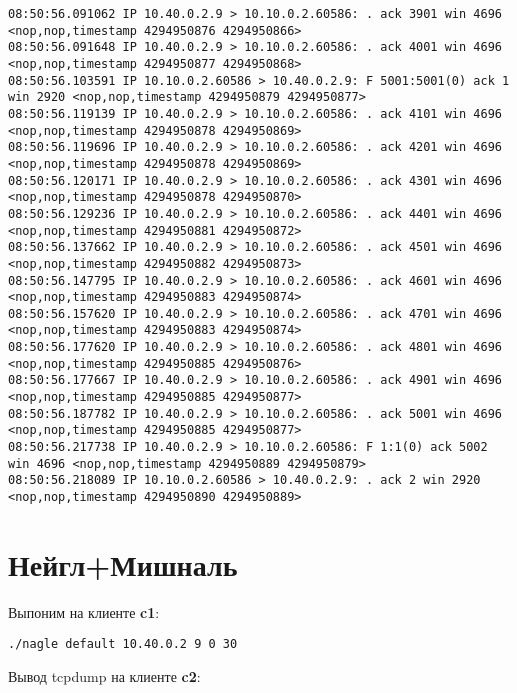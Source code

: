 \documentclass[a4paper,12pt]{article}
\begin{document}
\begin{Verbatim}
08:50:56.091062 IP 10.40.0.2.9 > 10.10.0.2.60586: . ack 3901 win 4696 <nop,nop,timestamp 4294950876 4294950866>
08:50:56.091648 IP 10.40.0.2.9 > 10.10.0.2.60586: . ack 4001 win 4696 <nop,nop,timestamp 4294950877 4294950868>
08:50:56.103591 IP 10.10.0.2.60586 > 10.40.0.2.9: F 5001:5001(0) ack 1 win 2920 <nop,nop,timestamp 4294950879 4294950877>
08:50:56.119139 IP 10.40.0.2.9 > 10.10.0.2.60586: . ack 4101 win 4696 <nop,nop,timestamp 4294950878 4294950869>
08:50:56.119696 IP 10.40.0.2.9 > 10.10.0.2.60586: . ack 4201 win 4696 <nop,nop,timestamp 4294950878 4294950869>
08:50:56.120171 IP 10.40.0.2.9 > 10.10.0.2.60586: . ack 4301 win 4696 <nop,nop,timestamp 4294950878 4294950870>
08:50:56.129236 IP 10.40.0.2.9 > 10.10.0.2.60586: . ack 4401 win 4696 <nop,nop,timestamp 4294950881 4294950872>
08:50:56.137662 IP 10.40.0.2.9 > 10.10.0.2.60586: . ack 4501 win 4696 <nop,nop,timestamp 4294950882 4294950873>
08:50:56.147795 IP 10.40.0.2.9 > 10.10.0.2.60586: . ack 4601 win 4696 <nop,nop,timestamp 4294950883 4294950874>
08:50:56.157620 IP 10.40.0.2.9 > 10.10.0.2.60586: . ack 4701 win 4696 <nop,nop,timestamp 4294950883 4294950874>
08:50:56.177620 IP 10.40.0.2.9 > 10.10.0.2.60586: . ack 4801 win 4696 <nop,nop,timestamp 4294950885 4294950876>
08:50:56.177667 IP 10.40.0.2.9 > 10.10.0.2.60586: . ack 4901 win 4696 <nop,nop,timestamp 4294950885 4294950877>
08:50:56.187782 IP 10.40.0.2.9 > 10.10.0.2.60586: . ack 5001 win 4696 <nop,nop,timestamp 4294950885 4294950877>
08:50:56.217738 IP 10.40.0.2.9 > 10.10.0.2.60586: F 1:1(0) ack 5002 win 4696 <nop,nop,timestamp 4294950889 4294950879>
08:50:56.218089 IP 10.10.0.2.60586 > 10.40.0.2.9: . ack 2 win 2920 <nop,nop,timestamp 4294950890 4294950889>
\end{Verbatim}

\section{Нейгл+Мишналь}

Выпоним на клиенте \textbf{c1}:
\begin{Verbatim}
./nagle default 10.40.0.2 9 0 30
\end{Verbatim}

Вывод tcpdump на клиенте \textbf{c2}:
\end{document}
